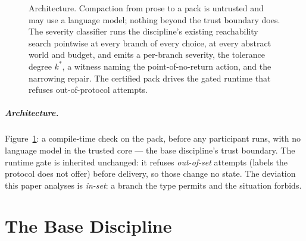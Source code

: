\documentclass[a4paper,UKenglish,cleveref,autoref,thm-restate,anonymous]{lipics-v2021}
\newcommand{\kstar}{k^{*}}
\begin{document}
\begin{figure}[t]
\centering
\resizebox{\textwidth}{!}{}
\caption{Architecture. Compaction from prose to a pack is untrusted and may
use a language model; nothing beyond the trust boundary does. The severity
classifier runs the discipline's existing reachability search pointwise at
every branch of every choice, at every abstract world and budget, and emits a
per-branch severity, the tolerance degree $\kstar$, a witness naming the
point-of-no-return action, and the narrowing repair. The certified pack drives
the gated runtime that refuses out-of-protocol attempts.}
\label{fig:arch}
\end{figure}

\subparagraph*{Architecture.}
Figure~\ref{fig:arch}: a compile-time check on the pack, before any
participant runs, with no language model in the trusted core --- the base
discipline's trust boundary. The runtime gate is inherited unchanged: it
refuses \emph{out-of-set} attempts (labels the protocol does not offer) before
delivery, so those change no state. The deviation this paper analyses is
\emph{in-set}: a branch the type permits and the situation forbids.

\section{The Base Discipline}\label{sec:base}
\end{document}
